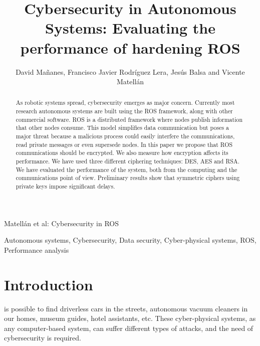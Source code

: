 \documentclass[journal,twoside]{JoPhA}
\begin{document}
\title{Cybersecurity in Autonomous Systems: Evaluating the performance of hardening ROS}

\author{David Ma\~nanes, Francisco Javier Rodr\'iguez Lera, Jes\'us Balsa and Vicente Matell\'an
}

%
{Matell\'an et al: Cybersecurity in ROS}
\maketitle


\begin{abstract}
As robotic systems spread, cybersecurity emerges as major concern. Currently most research autonomous systems are built using the ROS framework, along with other commercial software. 
ROS is a distributed framework where nodes publish information that other nodes consume. 
This model simplifies data communication but poses a major threat because a malicious process could easily interfere the communications, read private messages or even supersede nodes. In this paper we propose that ROS communications should be encrypted. We also measure how encryption affects its performance. We have used three different ciphering techniques: DES, AES and RSA. We have evaluated the performance of the system, both from the computing and the communications point of view. Preliminary results show that symmetric ciphers using private keys impose significant delays.

\end{abstract}


\begin{IEEEkeywords}
Autonomous systems, Cybersecurity, Data security, Cyber-physical systems, ROS, Performance analysis
\end{IEEEkeywords}


\section{Introduction}


 is possible to find driverless cars in the streets, autonomous vacuum cleaners in our homes, museum guides, hotel assistants, etc. These cyber-physical systems, as any computer-based system, can suffer different types of attacks, and the need of cybersecurity \cite{Morante2015} is required. 
\end{document}
